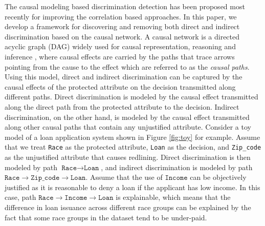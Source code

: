\documentclass[letterpaper]{article}
\begin{document}


The causal modeling based discrimination detection has been proposed most recently \cite{DBLP:journals/corr/BonchiHMR15,zhang2016situation,zhang2016discrimination} for improving the correlation based approaches. In this paper, we develop a framework for discovering and removing both direct and indirect discrimination based on the causal network. A causal network is a directed acyclic graph (DAG) widely used for causal representation, reasoning and inference \cite{pearl2009causality}, where causal effects are carried by the paths that trace arrows pointing from the cause to the effect which are referred to as the \emph{causal paths}. Using this model, direct and indirect discrimination can be captured by the causal effects of the protected attribute on the decision transmitted along different paths. Direct discrimination is modeled by the causal effect transmitted along the direct path from the protected attribute to the decision. Indirect discrimination, on the other hand, is modeled by the causal effect transmitted along other causal paths that contain any unjustified attribute. Consider a toy model of a loan application system shown in Figure \ref{fig:toy} for example. Assume that we treat \texttt{Race} as the protected attribute, \texttt{Loan} as the decision, and \texttt{Zip\_code} as the unjustified attribute that causes redlining. Direct discrimination is then modeled by path $\texttt{Race}\rightarrow \texttt{Loan}$, and indirect discrimination is modeled by path $\texttt{Race}\rightarrow \texttt{Zip\_code}\rightarrow \texttt{Loan}$. Assume that the use of $\texttt{Income}$ can be objectively justified as it is reasonable to deny a loan if the applicant has low income. In this case, path $\texttt{Race}\rightarrow \texttt{Income}\rightarrow \texttt{Loan}$ is explainable, which means that the difference in loan issuance across different race groups can be explained by the fact that some race groups in the dataset tend to be under-paid.
\end{document}
